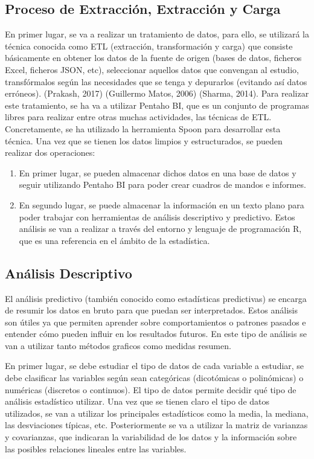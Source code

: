 \documentclass[spanish,12pt, a4paper,twoside]{paper}
\begin{document}
\subsection{Proceso de Extracción, Extracción y Carga}
En primer lugar, se va a realizar un tratamiento de datos, para ello, se utilizará la técnica conocida como ETL (extracción, transformación y carga) que consiste básicamente en obtener los datos de la fuente de origen (bases de datos, ficheros Excel, ficheros JSON, etc), seleccionar aquellos datos que convengan al estudio, transfórmalos según las necesidades que se tenga y depurarlos (evitando así datos erróneos). (Prakash, 2017) (Guillermo Matos, 2006) (Sharma, 2014).
Para realizar este tratamiento, se ha va a utilizar Pentaho BI, que es un conjunto de programas libres para realizar entre otras muchas actividades, las técnicas de ETL. Concretamente, se ha utilizado la herramienta Spoon para desarrollar esta técnica. 
Una vez que se tienen los datos limpios y estructurados, se pueden realizar dos operaciones:

\begin{enumerate}
\item  En primer lugar, se pueden almacenar dichos datos en una base de datos y seguir utilizando Pentaho BI para poder crear cuadros de mandos e informes. 
\item  En segundo lugar, se puede almacenar la información en un texto plano para poder trabajar con herramientas de análisis descriptivo y predictivo. Estos análisis se van a realizar a través del entorno y lenguaje de programación R, que es una referencia en el ámbito de la estadística.
\end{enumerate}

\subsection{Análisis Descriptivo}
El análisis predictivo (también conocido como estadísticas predictivas) se encarga de resumir los datos en bruto para que puedan ser interpretados. Estos análisis son útiles ya que permiten aprender sobre comportamientos o patrones pasados e entender cómo pueden influir en los resultados futuros. En este tipo de análisis se van a utilizar tanto métodos graficos como medidas resumen.

En primer lugar, se debe estudiar el tipo de datos de cada variable a estudiar, se debe clasificar las variables según sean categóricas (dicotómicas o polinómicas) o numéricas (discretos o continuos). El tipo de datos permite decidir qué tipo de análisis estadístico utilizar.
Una vez que se tienen claro el tipo de datos utilizados, se van a utilizar los principales estadísticos como la media, la mediana, las desviaciones típicas, etc.
Posteriormente se va a utilizar la matriz de varianzas y covarianzas, que indicaran la variabilidad de los datos y la información sobre las posibles relaciones lineales entre las variables. 
\end{document}
